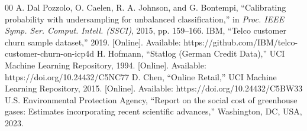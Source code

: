 \documentclass[conference]{IEEEtran}
\begin{document}
\begin{thebibliography}{00}
 A. Dal Pozzolo, O. Caelen, R. A. Johnson, and G. Bontempi, ``Calibrating probability with undersampling for unbalanced classification,'' in \emph{Proc. IEEE Symp. Ser. Comput. Intell. (SSCI)}, 2015, pp. 159--166.
 IBM, ``Telco customer churn sample dataset,'' 2019. [Online]. Available: https://github.com/IBM/telco-customer-churn-on-icp4d
 H. Hofmann, ``Statlog (German Credit Data),'' UCI Machine Learning Repository, 1994. [Online]. Available: https://doi.org/10.24432/C5NC77
 D. Chen, ``Online Retail,'' UCI Machine Learning Repository, 2015. [Online]. Available: https://doi.org/10.24432/C5BW33
 U.S. Environmental Protection Agency, ``Report on the social cost of greenhouse gases: Estimates incorporating recent scientific advances,'' Washington, DC, USA, 2023.
\end{thebibliography}
\end{document}
